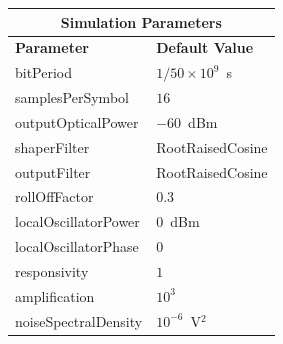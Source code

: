 \begin{table}[H]
	\centering
	\footnotesize
	\begin{tabular}{|l|l|}
		\hline
		\multicolumn{2}{|c|}{ \textbf{Simulation Parameters} } \\
		\hline
		\textbf{Parameter}     & \textbf{Default Value}                                     \\\hline
		bitPeriod              & $1/50\times10^9$~s														\\\hline
		samplesPerSymbol       & $16$                                                       \\\hline
		outputOpticalPower     & $-60$~dBm 													\\ \hline
		shaperFilter	       & RootRaisedCosine												\\ \hline
		outputFilter		   & RootRaisedCosine												\\ \hline
		rollOffFactor		   & 0.3														\\ \hline
		localOscillatorPower   & $0$~dBm                                                    \\ \hline
		localOscillatorPhase   & $0$                                                        \\ \hline
		responsivity           & $1$                                                        \\ \hline
		amplification          & $10^3$                                                     \\ \hline
		noiseSpectralDensity   & $10^{-6}$~V$^2$                             					\\ \hline
	\end{tabular}
\end{table}
